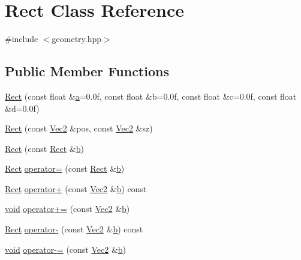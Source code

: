 \hypertarget{class_rect}{\section{Rect Class Reference}
\label{class_rect}
}


{\ttfamily \#include $<$geometry.\-hpp$>$}

\subsection*{Public Member Functions}
\begin{DoxyCompactItemize}
\item 
\hyperlink{class_rect_af6043872cc42625a4dd7e7fe6365f6bc}{Rect} (const float \&\hyperlink{_s_d_l__opengl__glext_8h_a3309789fc188587d666cda5ece79cf82}{a}=0.\-0f, const float \&b=0.\-0f, const float \&c=0.\-0f, const float \&d=0.\-0f)
\item 
\hyperlink{class_rect_a3b1d123c84de85095f12292347a10a55}{Rect} (const \hyperlink{class_vec2}{Vec2} \&pos, const \hyperlink{class_vec2}{Vec2} \&sz)
\item 
\hyperlink{class_rect_aad78eaf35511ef12729719c91cfa76d4}{Rect} (const \hyperlink{class_rect}{Rect} \&\hyperlink{_s_d_l__opengl__glext_8h_a0f71581a41fd2264c8944126dabbd010}{b})
\item 
\hyperlink{class_rect}{Rect} \hyperlink{class_rect_a96b3fe02c7b1c9e1d8f422b9608eb8f5}{operator=} (const \hyperlink{class_rect}{Rect} \&\hyperlink{_s_d_l__opengl__glext_8h_a0f71581a41fd2264c8944126dabbd010}{b})
\item 
\hyperlink{class_rect}{Rect} \hyperlink{class_rect_ad329babc3563274ff892108bf4ef8bcc}{operator+} (const \hyperlink{class_vec2}{Vec2} \&\hyperlink{_s_d_l__opengl__glext_8h_a0f71581a41fd2264c8944126dabbd010}{b}) const 
\item 
\hyperlink{_s_d_l__opengles2__gl2ext_8h_ae5d8fa23ad07c48bb609509eae494c95}{void} \hyperlink{class_rect_a16676b2d4e2a9e62757ff27e740e4bc8}{operator+=} (const \hyperlink{class_vec2}{Vec2} \&\hyperlink{_s_d_l__opengl__glext_8h_a0f71581a41fd2264c8944126dabbd010}{b})
\item 
\hyperlink{class_rect}{Rect} \hyperlink{class_rect_ae2beccf88819053001c7dfbf5f807ab2}{operator-\/} (const \hyperlink{class_vec2}{Vec2} \&\hyperlink{_s_d_l__opengl__glext_8h_a0f71581a41fd2264c8944126dabbd010}{b}) const 
\item 
\hyperlink{_s_d_l__opengles2__gl2ext_8h_ae5d8fa23ad07c48bb609509eae494c95}{void} \hyperlink{class_rect_a71d478b2e31e57772af19067ae7e4f69}{operator-\/=} (const \hyperlink{class_vec2}{Vec2} \&\hyperlink{_s_d_l__opengl__glext_8h_a0f71581a41fd2264c8944126dabbd010}{b})

\end{DoxyCompactItemize}
